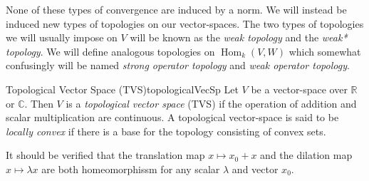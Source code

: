 \documentclass[oneside]{book}
\newcommand{\R}{\mathbb{R}}
\newcommand{\C}{\mathbb{C}}
\newcommand{\Hom}{\operatorname{Hom}}
\begin{document}
None of these types of convergence are induced by a norm. We will instead be induced new types of topologies on our
vector-spaces. The two types of topologies we will usually impose on $V$ will be known as the \emph{weak topology} and
the \emph{weak* topology}. We will define analogous topologies on $\Hom_k(V, W)$ which somewhat confusingly will be
named \emph{strong operator topology} and \emph{weak operator topology}.

\begin{defn}{Topological Vector Space (TVS)}{topologicalVecSp}
	Let $V$ be a vector-space over $\R$ or $\C$. Then $V$ is a \emph{topological vector space} (TVS) if the operation of addition and
	scalar multiplication are continuous. A topological vector-space is said to be \emph{locally convex} if there is
	a base for the topology consisting of convex sets.
\end{defn}

It should be verified that the translation map $x \mapsto x_0 + x$ and the dilation map $x \mapsto \lambda x$ are both
homeomorphissm for any scalar $\lambda$ and vector $x_0$.
\end{document}
